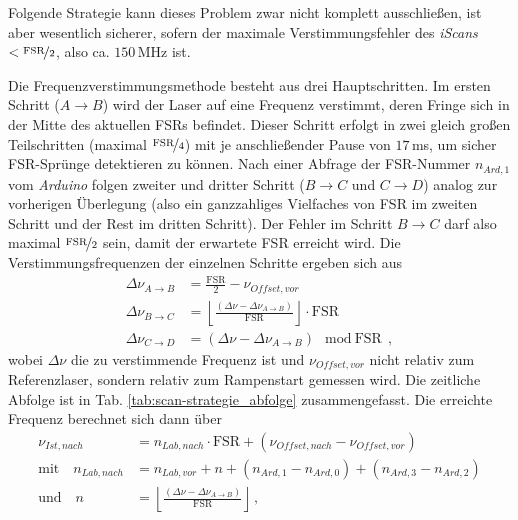 Folgende Strategie kann dieses Problem zwar nicht komplett ausschließen, ist aber
wesentlich sicherer, sofern der maximale Verstimmungsfehler des \textit{iScans}
$<\nicefrac{\text{FSR}}{2}$, also ca. $150\,$MHz ist.\par
Die Frequenzverstimmungsmethode besteht aus drei Hauptschritten. Im ersten
Schritt ($A\rightarrow B$) wird der Laser auf eine Frequenz verstimmt, deren
Fringe sich in der Mitte des aktuellen FSRs befindet. Dieser Schritt erfolgt in
zwei gleich großen Teilschritten (maximal $\nicefrac{\text{FSR}}{4}$) mit je
anschließender Pause von $17\,$ms, um sicher FSR-Sprünge detektieren zu können.
Nach einer Abfrage der FSR-Nummer $n_{Ard,1}$ vom \textit{Arduino} folgen zweiter und dritter Schritt ($B\rightarrow C$ und $C\rightarrow D$) analog zur
vorherigen Überlegung (also ein ganzzahliges Vielfaches von FSR im zweiten
Schritt und der Rest im dritten Schritt). Der Fehler im Schritt $B\rightarrow C$
darf also maximal $\nicefrac{\text{FSR}}{2}$ sein, damit der erwartete FSR erreicht wird. Die Verstimmungsfrequenzen der einzelnen Schritte ergeben sich aus
\begin{equation}\label{eq:scan-strategie_schritte}
	\begin{split}
		\Delta\nu_{A\rightarrow B}&=\frac{\text{FSR}}{2}-\nu_{Offset,vor}\\
		\Delta\nu_{B\rightarrow
		C}&=\left\lfloor\frac{(\Delta\nu-\Delta\nu_{A\rightarrow
		B})}{\text{FSR}}\right\rfloor\cdot\text{FSR}\\
		\Delta\nu_{C\rightarrow D}&=(\Delta\nu-\Delta\nu_{A\rightarrow
		B})\mod\text{FSR}\,,
	\end{split}
\end{equation}
wobei $\Delta\nu$ die zu verstimmende Frequenz ist und $\nu_{Offset,vor}$ nicht
relativ zum Referenzlaser, sondern relativ zum Rampenstart gemessen wird. Die
zeitliche Abfolge ist in Tab. \ref{tab:scan-strategie_abfolge} zusammengefasst.
Die erreichte Frequenz berechnet sich dann über
\begin{equation}\label{eq:neue_frequenz_strategie_2}
	\begin{split}
		\nu_{Ist,nach} &=
		n_{Lab,nach}\cdot\text{FSR}+(\nu_{Offset,nach}-\nu_{Offset,vor})\\
		\text{mit}\quad
		n_{Lab,nach} &= n_{Lab,vor}+n+(n_{Ard,1}-n_{Ard,0})+(n_{Ard,3}-n_{Ard,2})\\
		\text{und}\quad
		n &= \left\lfloor\frac{(\Delta\nu-\Delta\nu_{A\rightarrow
		B})}{\text{FSR}}\right\rfloor\,,
	\end{split}
\end{equation}
